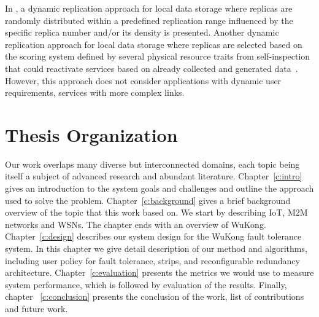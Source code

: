 In \cite{Piotrowski2009}, a dynamic replication approach for local data storage
where replicas are randomly distributed within a predefined replication range
influenced by the specific replica number and/or its density is presented. 
Another dynamic replication approach for local data storage where replicas are
selected based on the scoring system defined by several physical resource traits
from self-inspection that could reactivate services based on already collected
and generated data~\cite{Neumann2010}. However, this approach does not consider
applications with dynamic user requirements, services with more complex links.

\section{Thesis Organization}

Our work overlaps many diverse but interconnected domains, each topic being
itself a subject of advanced research and abundant literature.
Chapter~\ref{c:intro} gives an introduction to the system goals and challenges
and outline the approach used to solve the problem. Chapter~\ref{c:background}
gives a brief background overview of the topic that this work based on.  We
start by describing IoT, M2M networks and WSNs. The chapter ends with an
overview of WuKong. Chapter~\ref{c:design} describes our system design for the
WuKong fault tolerance system. In this chapter we give detail description of our
method and algorithms, including user policy for fault tolerance, strips, and
reconfigurable redundancy architecture.  Chapter~\ref{c:evaluation} presents the
metrics we would use to measure system performance, which is followed by
evaluation of the results. Finally, chapter ~\ref{c:conclusion} presents the
conclusion of the work, list of contributions and future work.
